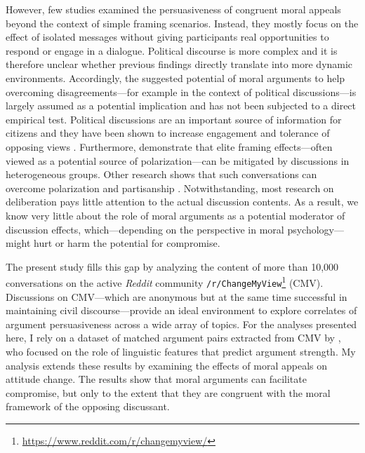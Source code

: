 However, few studies examined the persuasiveness of congruent moral appeals beyond the context of simple framing scenarios. Instead, they mostly focus on the effect of isolated messages without giving participants real opportunities to respond or engage in a dialogue. Political discourse is more complex and it is therefore unclear whether previous findings directly translate into more dynamic environments. Accordingly, the suggested potential of moral arguments to help overcoming disagreements---for example in the context of political discussions---is largely assumed as a potential implication and has not been subjected to a direct empirical test. Political discussions are an important source of information for citizens \citep{huckfeldt1995political} and they have been shown to increase engagement and tolerance of opposing views \citep{mutz2002cross}. Furthermore, \citet{druckman2003framing} demonstrate that elite framing effects---often viewed as a potential source of polarization---can be mitigated by discussions in heterogeneous groups. Other research shows that such conversations can overcome polarization and partisanship \citep{klar2014partisanship}. Notwithstanding, most research on deliberation pays little attention to the actual discussion contents. As a result, we know very little about the role of moral arguments as a potential moderator of discussion effects, which---depending on the perspective in moral psychology---might hurt or harm the potential for compromise. 

The present study fills this gap by analyzing the content of more than 10,000 conversations on the active \textit{Reddit} community \texttt{/r/ChangeMyView}\footnote{\url{https://www.reddit.com/r/changemyview/}} (CMV). Discussions on CMV---which are anonymous but at the same time successful in maintaining civil discourse---provide an ideal environment to explore correlates of argument persuasiveness across a wide array of topics. For the analyses presented here, I rely on a dataset of matched argument pairs extracted from CMV by \citet{tan2016winning}, who focused on the role of linguistic features that predict argument strength. My analysis extends these results by examining the effects of moral appeals on attitude change. The results show that moral arguments can facilitate compromise, but only to the extent that they are congruent with the moral framework of the opposing discussant.




